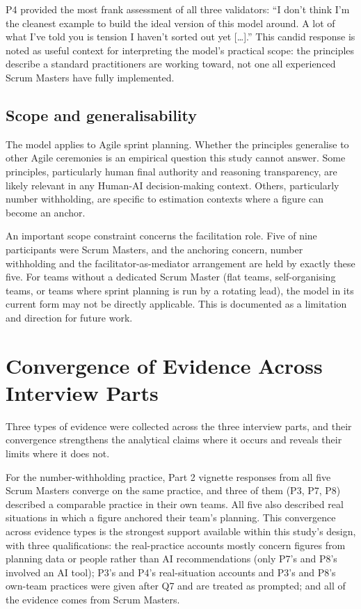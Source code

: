 \documentclass[a4paper,twoside]{bth}
\begin{document}
P4 provided the most frank assessment of all three validators: ``I don't think I'm the cleanest example to build the ideal version of this model around. A lot of what I've told you is tension I haven't sorted out yet {[}\ldots{]}.'' This candid response is noted as useful context for interpreting the model's practical scope: the principles describe a standard practitioners are working toward, not one all experienced Scrum Masters have fully implemented.

\subsection{Scope and generalisability}

The model applies to Agile sprint planning. Whether the principles generalise to other Agile ceremonies is an empirical question this study cannot answer. Some principles, particularly human final authority and reasoning transparency, are likely relevant in any Human-AI decision-making context. Others, particularly number withholding, are specific to estimation contexts where a figure can become an anchor.

An important scope constraint concerns the facilitation role. Five of nine participants were Scrum Masters, and the anchoring concern, number withholding and the facilitator-as-mediator arrangement are held by exactly these five. For teams without a dedicated Scrum Master (flat teams, self-organising teams, or teams where sprint planning is run by a rotating lead), the model in its current form may not be directly applicable. This is documented as a limitation and direction for future work.

\section{Convergence of Evidence Across Interview Parts}

Three types of evidence were collected across the three interview parts, and their convergence strengthens the analytical claims where it occurs and reveals their limits where it does not.

For the number-withholding practice, Part 2 vignette responses from all five Scrum Masters converge on the same practice, and three of them (P3, P7, P8) described a comparable practice in their own teams. All five also described real situations in which a figure anchored their team's planning. This convergence across evidence types is the strongest support available within this study's design, with three qualifications: the real-practice accounts mostly concern figures from planning data or people rather than AI recommendations (only P7's and P8's involved an AI tool); P3's and P4's real-situation accounts and P3's and P8's own-team practices were given after Q7 and are treated as prompted; and all of the evidence comes from Scrum Masters.
\end{document}
